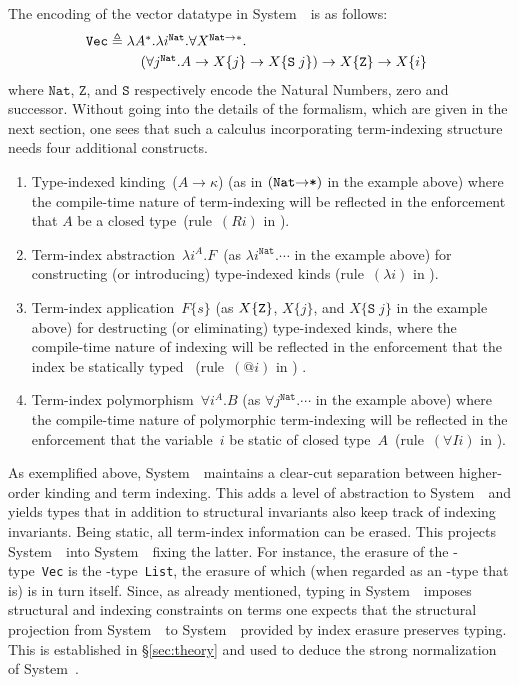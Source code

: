 The encoding of the vector datatype in System~\Fi\ is as follows: 
\begin{equation*}\label{FiVecType}
\texttt{{Vec}}
\triangleq
\!\!\!
\begin{array}[t]{l}
\lambda A^\mathtt{*}.\lambda
i^{\texttt{{Nat}}}.  \forall X^{\texttt{{Nat}}\to\mathtt{*}}.\\[1mm]
\quad 
  (\forall j^{\texttt{{Nat}}}.A\to X\{j\}\to X\{\texttt{{S}}\; j\})
  \to X\{\texttt{{Z}}\}
    \to X\{i\}
\end{array}
\end{equation*}
where $\texttt{{Nat}}$, $\mathtt Z$, and $\mathtt S$ respectively encode
the Natural Numbers, zero and successor.
Without going into the details of the formalism, which are given in the
next section, one sees that such a calculus incorporating term-indexing
structure needs four additional constructs.
\begin{enumerate}
\item 
  Type-indexed kinding~($A\to\kappa$) (as in $(\texttt{{Nat}\ensuremath{\to}*})$
  in the example above) where the compile-time nature of term-indexing
  will be reflected in the enforcement that $A$ be a closed
  type~(rule~$(Ri)$ in ).

\item 
  Term-index abstraction~$\lambda i^A.F$~(as $\lambda
  i^{\texttt{{Nat}}}.\cdots$ in the example above) for constructing (or
  introducing) type-indexed kinds (rule~$(\lambda i)$ in
  ).  

\item 
  Term-index application~$F\{s\}$ (as $X\{{\tt Z}\}$, $X\{j\}$, and
  $X\{\texttt{S}\;j\}$ in the example above) for destructing (or
  eliminating) type-indexed kinds, where the compile-time nature of
  indexing will be reflected in the enforcement that the index be
  statically typed%
~(rule~$(@i)$ in ) .

\item 
  Term-index polymorphism~$\forall i^A.B$ (as $\forall
  j^{\texttt{{Nat}}}.\cdots$ in the example above) where the compile-time
  nature of polymorphic term-indexing will be reflected in the enforcement
  that the variable~$i$ be static of closed type~$A$~(rule~$(\forall
  Ii)$ in ).
\end{enumerate}

As exemplified above, System~\Fi\ maintains a clear-cut separation between
higher-order kinding and term indexing.  This adds a level of abstraction
to System~\Fw\ and yields types that in addition to structural invariants
also keep track of indexing invariants.  Being static, all term-index
information can be erased.  This projects System~\Fi\ into System~\Fw\
fixing the latter.  For instance, the erasure of the \Fi-type~\texttt{Vec}
is the \Fw-type~\texttt{List}, the erasure of which (when regarded as an
\Fi-type that is) is in turn itself.  Since, as already mentioned, typing
in System~\Fi\ imposes structural and indexing constraints on terms one
expects that the structural projection from System~\Fi\ to System~\Fw\
provided by index erasure preserves typing.  This is established in
\S\ref{sec:theory} and used to deduce the strong normalization of
System~\Fi.

